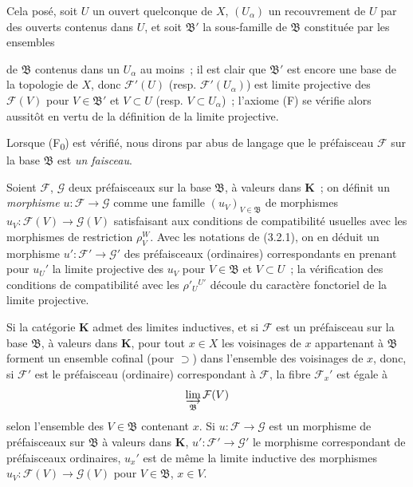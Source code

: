 \begin{env}[3.2.2]
Cela posé, soit $U$ un ouvert quelconque de $X$, $(U_\alpha)$ un recouvrement
de $U$ par des ouverts contenus dans $U$, et soit $\mathfrak{B}'$ la
sous-famille de $\mathfrak{B}$ constituée par les ensembles


de $\mathfrak{B}$ contenus dans un $U_\alpha$ au moins~; il est clair que
$\mathfrak{B}'$ est encore une base de la topologie de $X$, donc
$\mathcal{F}'(U)$ (resp. $\mathcal{F}'(U_\alpha)$) est limite projective des
$\mathcal{F}(V)$ pour $V\in\mathfrak{B}'$ et $V\subset U$ (resp.
$V\subset U_\alpha$)~; l'axiome (F) se vérifie alors aussitôt en vertu de la
définition de la limite projective.

Lorsque (F\textsubscript{0}) est vérifié, nous dirons par abus de langage que
le préfaisceau $\mathcal{F}$ sur la base $\mathfrak{B}$ est \emph{un faisceau}.
\end{env}

\begin{env}[3.2.3]
\label{0.3.2.3-fr}
Soient $\mathcal{F}$, $\mathcal{G}$ deux préfaisceaux sur la base
$\mathfrak{B}$, à valeurs dans $\boldsymbol{K}$~; on définit un \emph{morphisme}
$u:\mathcal{F}\to\mathcal{G}$ comme une famille
$(u_V)_{V\in\mathfrak{B}}$ de morphismes
$u_V:\mathcal{F}(V)\to\mathcal{G}(V)$ satisfaisant aux conditions de
compatibilité usuelles avec les morphismes de restriction $\rho_V^W$. Avec
les notations de (3.2.1), on en déduit un morphisme
$u':\mathcal{F}'\to\mathcal{G}'$ des préfaisceaux (ordinaires) correspondants
en prenant pour $u_U'$ la limite projective des $u_V$ pour
$V\in\mathfrak{B}$ et $V\subset U$~; la vérification des conditions de
compatibilité avec les $\rho'_U{}^{U'}$ découle du caractère fonctoriel de la
limite projective.
\end{env}

\begin{env}[3.2.4]
\label{0.3.2.4-fr}
Si la catégorie $\boldsymbol{K}$ admet des limites inductives, et si $\mathcal{F}$
est un préfaisceau sur la base $\mathfrak{B}$, à valeurs dans $\boldsymbol{K}$,
pour tout $x\in X$ les voisinages de $x$ appartenant à $\mathfrak{B}$ forment
un ensemble cofinal (pour $\supset$) dans l'ensemble des voisinages de $x$,
donc, si $\mathcal{F}'$ est le préfaisceau (ordinaire) correspondant à
$\mathcal{F}$, la fibre $\mathcal{F}_x'$ est égale à
\[
  \varinjlim_{\mathfrak{B}}\mathcal{F}(V)
\]
selon l'ensemble des $V\in\mathfrak{B}$ contenant $x$.
Si $u:\mathcal{F}\to\mathcal{G}$ est un morphisme de préfaisceaux sur
$\mathfrak{B}$ à valeurs dans $\boldsymbol{K}$,
$u':\mathcal{F}'\to\mathcal{G}'$ le morphisme correspondant de préfaisceaux
ordinaires, $u_x'$ est de même la limite inductive des morphismes
$u_V:\mathcal{F}(V)\to\mathcal{G}(V)$ pour $V\in\mathfrak{B}$, $x\in V$.
\end{env}

